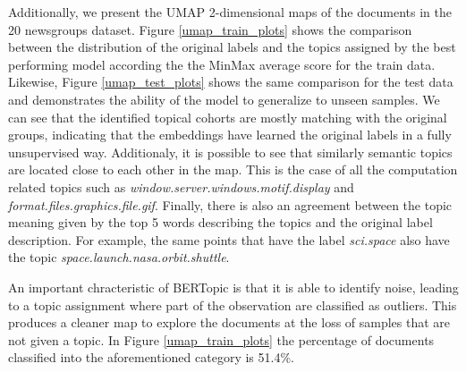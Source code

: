 \documentclass[a4paper]{article}
\begin{document}
Additionally, we present the UMAP 2-dimensional maps of the documents in the 20 newsgroups dataset. Figure \ref{umap_train_plots} shows the comparison between the distribution of the original labels and the topics assigned by the best performing model according the the MinMax average score for the train data. Likewise, Figure \ref{umap_test_plots} shows the same comparison for the test data and demonstrates the ability of the model to generalize to unseen samples. We can see that the identified topical cohorts are mostly matching with the original groups, indicating that the embeddings have learned the original labels in a fully unsupervised way. Additionaly, it is possible to see that similarly semantic topics are located close to each other in the map. This is the case of all the computation related topics such as \emph{window.server.windows.motif.display} and \emph{format.files.graphics.file.gif}. Finally, there is also an agreement between the topic meaning given by the top 5 words describing the topics and the original label description. For example, the same points that have the label \emph{sci.space} also have the topic \emph{space.launch.nasa.orbit.shuttle}.

An important chracteristic of BERTopic is that it is able to identify noise, leading to a topic assignment where part of the observation are classified as outliers. This produces a cleaner map to explore the documents at the loss of samples that are not given a topic. In Figure \ref{umap_train_plots} the percentage of documents classified into the aforementioned category is 51.4\%.
\end{document}
